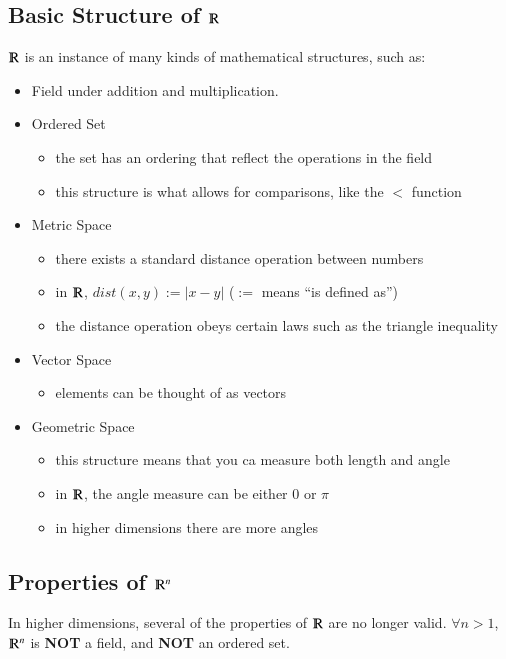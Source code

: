 \documentclass [12 pt, twoside] {book}
\newcommand\+{\text{ }}
\begin{document}
\subsection{Basic Structure of $\varmathbb{R}$}
$\varmathbb{R}$ is an instance of many kinds of mathematical structures, such as:
\begin{itemize}
    \item Field under addition and multiplication.
    \item Ordered Set
        \begin{itemize}
            \item the set has an ordering that reflect the operations in the
                field
            \item this structure is what allows for comparisons, like the $<$
                function
        \end{itemize}
    \item Metric Space
        \begin{itemize}
            \item there exists a standard distance operation between numbers
            \item in $\varmathbb{R}$, $dist(x, y) := |x - y|$ ($:=$ means ``is
                defined as'')
            \item the distance operation obeys certain laws such as the triangle
                inequality
        \end{itemize}
    \item Vector Space
        \begin{itemize}
            \item elements can be thought of as vectors
        \end{itemize}
    \item Geometric Space
        \begin{itemize}
            \item this structure means that you ca measure both length and angle
            \item in $\varmathbb{R}$, the angle measure can be either $0$ or $\pi$
            \item in higher dimensions there are more angles
        \end{itemize}
\end{itemize}

\subsection{Properties of $\varmathbb{R}^n$}
In higher dimensions, several of the properties of $\varmathbb{R}$ are no longer
valid. $\forall n > 1$, $\varmathbb{R}^n$ is \textbf{NOT} a field, and \textbf{NOT} an ordered set.
\end{document}
